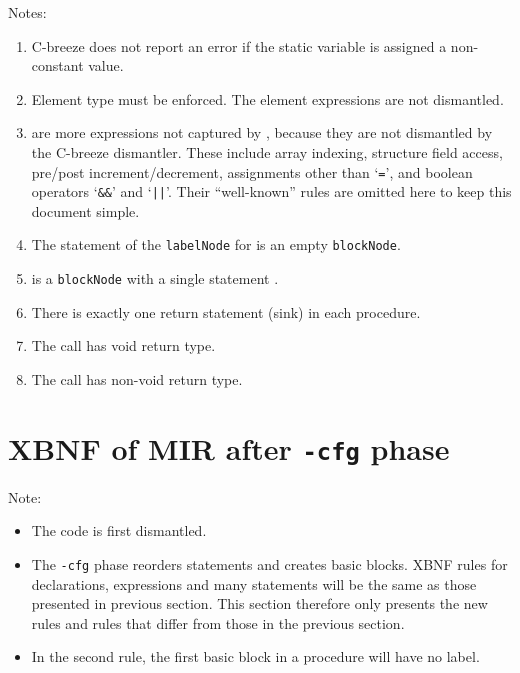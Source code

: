 \documentclass[10pt]{article}
\begin{document}
Notes:
\begin{enumerate}
\item C-breeze does not report an error if the static variable is assigned a
  non-constant value.
\item Element type must be enforced.  The element expressions are not
  dismantled.
\item {} are more expressions not captured by , 
  because they are not dismantled by the C-breeze dismantler.  These include 
  array indexing, structure field access, pre/post increment/decrement, 
  assignments other than `\texttt{=}', and boolean operators `\texttt{\&\&}' 
  and `\texttt{||}'.
  Their ``well-known'' rules are omitted here to keep this document simple.
\item The statement of the \texttt{labelNode} for  is an empty
  \texttt{blockNode}.
\item {} is a \texttt{blockNode} with a single statement
  .
\item There is exactly one return statement (sink) in each procedure.
\item The call has void return type.
\item The call has non-void return type.
\end{enumerate}



\section{XBNF of MIR after \texttt{-cfg} phase}
Note:
\begin{itemize}
\item The code is first dismantled.
\item The \texttt{-cfg} phase reorders statements and creates basic blocks.
  XBNF rules for declarations, expressions and many statements will be the 
  same as those presented in previous section.  This section therefore only 
  presents the new rules and rules that differ from those in the previous 
  section.
\item In the second rule, the first basic block in a procedure will have no
  label.
\end{itemize}
\end{document}
